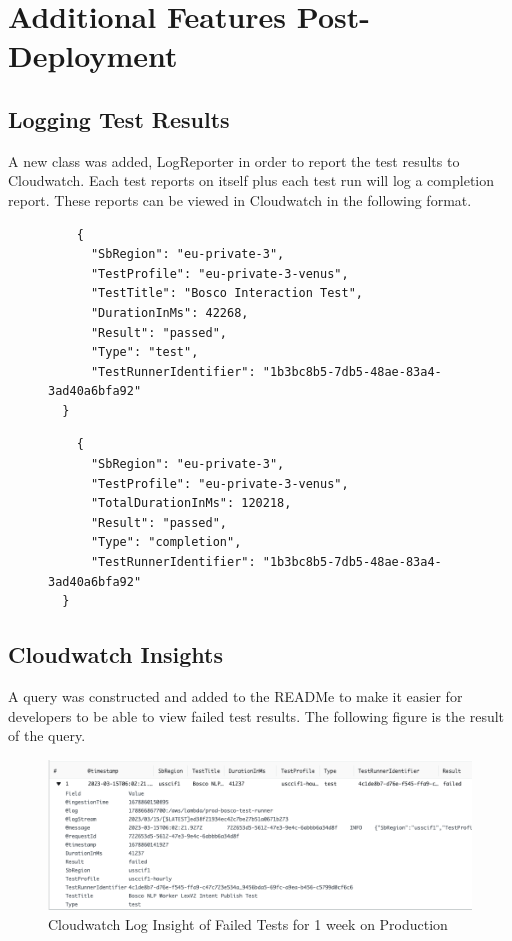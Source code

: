 \documentclass[12pt,a4paper,titlepage]{report}
\begin{document}
\section{Additional Features Post-Deployment}

\subsection{Logging Test Results}
A new class was added, LogReporter in order to report the test results to Cloudwatch. Each test reports on itself plus each test run will log a completion report. 
These reports can be viewed in Cloudwatch in the following format.

\begin{figure}[H]
  \begin{tcolorbox}
   \begin{verbatim}
    {
      "SbRegion": "eu-private-3",
      "TestProfile": "eu-private-3-venus",
      "TestTitle": "Bosco Interaction Test",
      "DurationInMs": 42268,
      "Result": "passed",
      "Type": "test",
      "TestRunnerIdentifier": "1b3bc8b5-7db5-48ae-83a4-3ad40a6bfa92"
  }
 \end{verbatim}
 \end{tcolorbox}
 \end{figure}

 \begin{figure}[H]
  \begin{tcolorbox}
   \begin{verbatim}
    {
      "SbRegion": "eu-private-3",
      "TestProfile": "eu-private-3-venus",
      "TotalDurationInMs": 120218,
      "Result": "passed",
      "Type": "completion",
      "TestRunnerIdentifier": "1b3bc8b5-7db5-48ae-83a4-3ad40a6bfa92"
  }
 \end{verbatim}
 \end{tcolorbox}
 \end{figure}

 \subsection{Cloudwatch Insights}
 A query was constructed and added to the READMe to make it easier for developers to be able to view failed test results.
 The following figure is the result of the query. 
 \begin{figure}[ht]
  \centering
  \includegraphics[width=\textwidth,height=\textheight,keepaspectratio]{./diagrams/insights.png}
  \caption{Cloudwatch Log Insight of Failed Tests for 1 week on Production}
 \end{figure}
\end{document}
